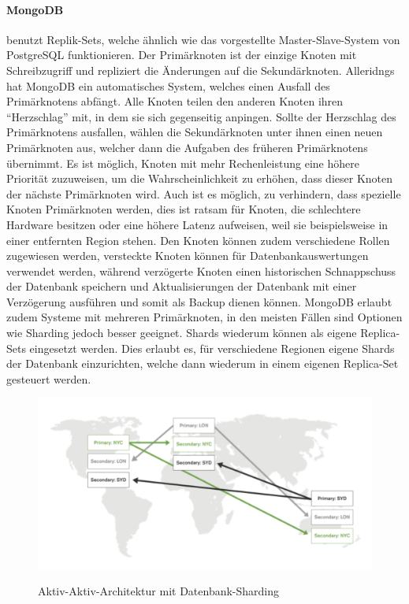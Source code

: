 \paragraph{MongoDB}
benutzt Replik-Sets, welche ähnlich wie das vorgestellte Master-Slave-System von PostgreSQL funktionieren. Der Primärknoten ist der einzige Knoten mit Schreibzugriff und repliziert die Änderungen auf die Sekundärknoten. Alleridngs hat MongoDB ein automatisches System, welches einen Ausfall des Primärknotens abfängt. Alle Knoten teilen den anderen Knoten ihren \enquote{Herzschlag} mit, in dem sie sich gegenseitig anpingen. Sollte der Herzschlag des Primärknotens ausfallen, wählen die Sekundärknoten unter ihnen einen neuen Primärknoten aus, welcher dann die Aufgaben des früheren Primärknotens übernimmt. Es ist möglich, Knoten mit mehr Rechenleistung eine höhere Priorität zuzuweisen, um die Wahrscheinlichkeit zu erhöhen, dass dieser Knoten der nächste Primärknoten wird. Auch ist es möglich, zu verhindern, dass spezielle Knoten Primärknoten werden, dies ist ratsam für Knoten, die schlechtere Hardware besitzen oder eine höhere Latenz aufweisen, weil sie beispielsweise in einer entfernten Region stehen. Den Knoten können zudem verschiedene Rollen zugewiesen werden, versteckte Knoten können für Datenbankauswertungen verwendet werden, während verzögerte Knoten einen historischen Schnappschuss der Datenbank speichern und Aktualisierungen der Datenbank mit einer Verzögerung ausführen und somit als Backup dienen können. \cite{MG10}\cite{MG11}\cite{MG12}\cite{MG13} MongoDB erlaubt zudem Systeme mit mehreren Primärknoten, in den meisten Fällen sind Optionen wie Sharding jedoch besser geeignet. \cite{MG14}
Shards wiederum können als eigene Replica-Sets eingesetzt werden. Dies erlaubt es, für verschiedene Regionen eigene Shards der Datenbank einzurichten, welche dann wiederum in einem eigenen Replica-Set gesteuert werden.

\begin{figure}[ht]
	\centering
    \includegraphics[width=\textwidth]{sources/MongoDB_sharded.png}\cite{MG14}
	\caption{Aktiv-Aktiv-Architektur mit Datenbank-Sharding}
	\label{fig1}
\end{figure}

